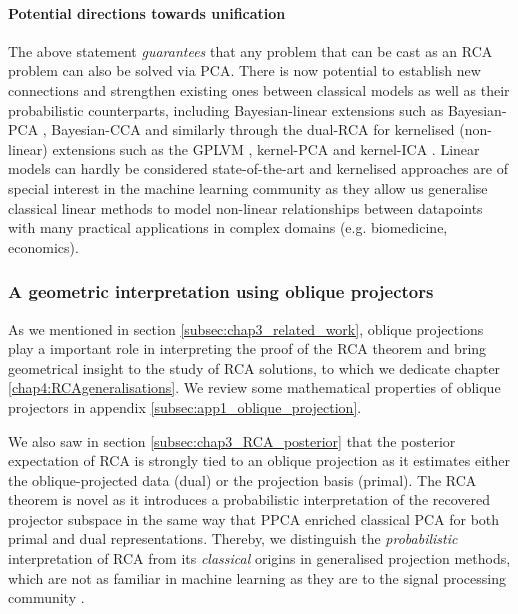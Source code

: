       \paragraph{Potential directions towards unification} The above statement \emph{guarantees} that any problem that can be cast as an RCA problem can also be solved via PCA. There is now potential to establish new connections and strengthen existing ones between classical models as well as their probabilistic counterparts, including Bayesian-linear extensions such as Bayesian-PCA \citep{Bishop:bayesPCA98}, Bayesian-CCA \citep{Klami:local07, Virtanen:bcca11, Wang:variational07} and similarly through the dual-RCA for kernelised (non-linear) extensions such as the GPLVM \citep{Lawrence:pnpca05}, kernel-PCA \citep{Scholkopf:kernelpca97} and kernel-ICA \citep{Bach:kica02}. Linear models can hardly be considered state-of-the-art and kernelised approaches are of special interest in the machine learning community as they allow us generalise classical linear methods to model non-linear relationships between datapoints with many practical applications in complex domains (e.g. biomedicine, economics).

      \subsubsection{A geometric interpretation using oblique projectors}
      As we mentioned in section \ref{subsec:chap3_related_work}, oblique projections play a important role in interpreting the proof of the RCA theorem and bring geometrical insight to the study of RCA solutions, to which we dedicate chapter \ref{chap4:RCAgeneralisations}. We review some mathematical properties of oblique projectors in appendix \ref{subsec:app1_oblique_projection}.

      We also saw in section \ref{subsec:chap3_RCA_posterior} that the posterior expectation of RCA is strongly tied to an oblique projection as it estimates either the oblique-projected data (dual) or the projection basis (primal). The RCA theorem is novel as it introduces a probabilistic interpretation of the recovered projector subspace in the same way that PPCA enriched classical PCA for both primal and dual representations. Thereby, we distinguish the \textit{probabilistic} interpretation of RCA from its \textit{classical} origins in generalised projection methods, which are not as familiar in machine learning as they are to the signal processing community \citep{Behrens:signal94, Chen:subspace06, Hu:subspace03}.
      
